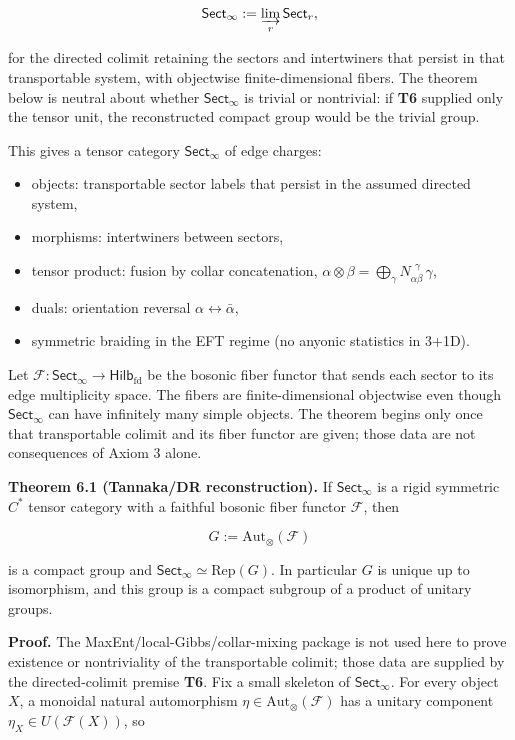 \[
\mathsf{Sect}_\infty := \varinjlim_r \mathsf{Sect}_r,
\]

for the directed colimit retaining the sectors and intertwiners that persist in that transportable system, with objectwise finite-dimensional fibers. The theorem below is neutral about whether \(\mathsf{Sect}_\infty\) is trivial or nontrivial: if \textbf{T6} supplied only the tensor unit, the reconstructed compact group would be the trivial group.

This gives a tensor category \(\mathsf{Sect}_\infty\) of edge charges:

\begin{itemize}
\tightlist
\item
  objects: transportable sector labels that persist in the assumed directed system,
\item
  morphisms: intertwiners between sectors,
\item
  tensor product: fusion by collar concatenation, \(\alpha \otimes \beta = \bigoplus_\gamma N_{\alpha\beta}^{\ \ \gamma}\,\gamma\),
\item
  duals: orientation reversal \(\alpha \leftrightarrow \bar\alpha\),
\item
  symmetric braiding in the EFT regime (no anyonic statistics in 3+1D).
\end{itemize}

Let \(\mathcal F: \mathsf{Sect}_\infty \to \mathsf{Hilb}_{\mathrm{fd}}\) be the bosonic fiber functor that sends each sector to its edge multiplicity space. The fibers are finite-dimensional objectwise even though \(\mathsf{Sect}_\infty\) can have infinitely many simple objects. The theorem begins only once that transportable colimit and its fiber functor are given; those data are not consequences of Axiom 3 alone.

\textbf{Theorem 6.1 (Tannaka/DR reconstruction).} If \(\mathsf{Sect}_\infty\) is a rigid symmetric \(C^*\) tensor category with a faithful bosonic fiber functor \(\mathcal F\), then

\[
G := \mathrm{Aut}_\otimes(\mathcal F)
\]

is a compact group and \(\mathsf{Sect}_\infty \simeq \mathrm{Rep}(G)\). In particular \(G\) is unique up to isomorphism, and this group is a compact subgroup of a product of unitary groups.

\textbf{Proof.} The MaxEnt/local-Gibbs/collar-mixing package is not used here to prove existence or nontriviality of the transportable colimit; those data are supplied by the directed-colimit premise \textbf{T6}. Fix a small skeleton of \(\mathsf{Sect}_\infty\). For every object \(X\), a monoidal natural automorphism \(\eta \in \mathrm{Aut}_\otimes(\mathcal F)\) has a unitary component \(\eta_X \in U(\mathcal F(X))\), so

